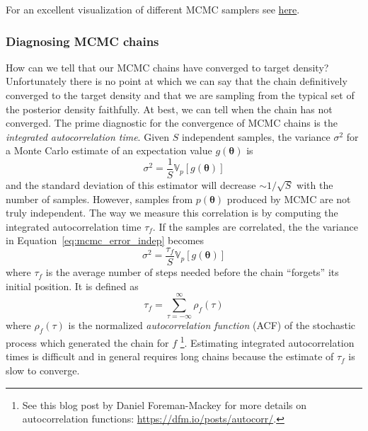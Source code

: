 \documentclass[12pt,dvipsnames]{report}
\renewcommand{\vec}[1]{\boldsymbol{\mathbf{#1}}}
\begin{document}
For an excellent visualization of different MCMC samplers see 
\href{http://chi-feng.github.io/mcmc-demo/app.html}{here}.


\subsubsection{Diagnosing MCMC chains}
How can we tell that our MCMC chains have converged to target density?
Unfortunately there is no point at which we can say that the chain definitively
converged to the target density and that we are sampling from the typical set of 
the posterior density faithfully. At best, we can
tell when the chain has not converged. The prime diagnostic for the convergence
of MCMC chains is the \textsl{integrated autocorrelation time}.
Given $S$ independent samples, the variance $\sigma^2$ for a Monte Carlo 
estimate of an expectation value $g(\vec\theta)$  is 
\begin{equation}
    \sigma^2= \frac{1}{S} \mathbb{V}_{p}\left[g(\vec\theta)\right]
    \label{eq:mcmc_error_indep}
\end{equation}
and the standard deviation of this estimator will decrease
$\sim 1/\sqrt{S}$ with the number of samples.
However, samples from $p(\vec\theta)$ produced by MCMC are not truly independent.
The way we measure this correlation is by computing the integrated autocorrelation
time $\tau_f$. If the samples are correlated, the the variance in 
Equation~\ref{eq:mcmc_error_indep} becomes
\begin{equation}
    \sigma^2= \frac{\tau_f}{S} \mathbb{V}_{p}\left[g(\vec\theta)\right]
    \label{eq:mcmc_error}
\end{equation}
where $\tau_f$ is the average number of steps needed before the chain ``forgets''
its initial position. It is defined as
\begin{equation}
    \tau_f = \sum_{\tau=-\infty}^\infty\rho_f(\tau)
\end{equation}
where $\rho_f(\tau)$ is the normalized \textsl{autocorrelation function} (ACF) of 
the stochastic process which  generated the chain for
$f$ \footnote{See this blog post by Daniel Foreman-Mackey for more details on 
autocorrelation functions: \url{https://dfm.io/posts/autocorr/}.}.
Estimating integrated autocorrelation times is difficult and in general
requires long chains because the estimate of $\tau_f$ is slow to converge.
\end{document}
